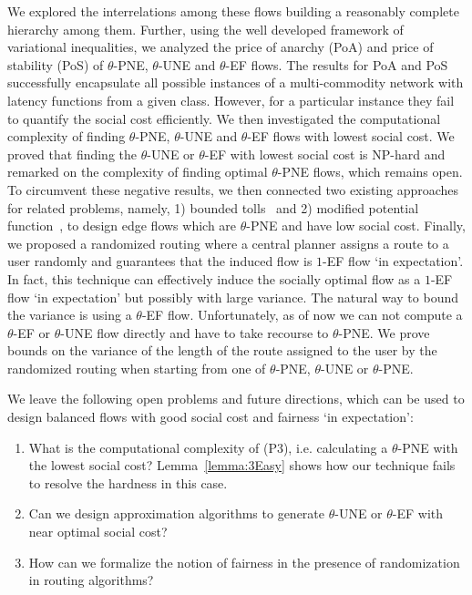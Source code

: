 We explored the interrelations among these flows building a reasonably complete hierarchy among them. Further, using the well developed framework of variational inequalities, we analyzed the price of anarchy (PoA) and price of stability (PoS) of $\theta$-PNE, $\theta$-UNE and $\theta$-EF flows. The results for PoA and PoS successfully encapsulate all possible instances of a multi-commodity network with latency functions from a given class. However, for a particular instance they fail to quantify the social cost efficiently.  
We then investigated the computational complexity of
finding $\theta$-PNE, $\theta$-UNE and $\theta$-EF flows with lowest social cost.  We proved that finding the $\theta$-UNE or $\theta$-EF with lowest social cost is NP-hard and remarked on the complexity of finding optimal $\theta$-PNE flows, which remains open.  
To circumvent these negative results, we then connected two existing approaches for related problems, namely, 1) bounded tolls~\cite{bonifaci2011efficiency} and  2) modified potential function~\cite{christodoulou2011performance}, to design edge flows which are $\theta$-PNE and have low social cost. Finally, we proposed a randomized routing where a central planner assigns a route to a user randomly and guarantees that the induced flow is $1$-EF flow `in expectation'. In fact, this technique can effectively induce the socially optimal flow as a $1$-EF flow `in expectation' but  possibly with large variance. The natural way to bound the variance is using a $\theta$-EF flow. Unfortunately, as of now we can not compute a $\theta$-EF or $\theta$-UNE flow directly and have to take recourse to $\theta$-PNE. We prove bounds on the variance of the length of the route assigned to the user by the randomized routing when starting from one of $\theta$-PNE, $\theta$-UNE or $\theta$-PNE.
         
We leave the following open problems and future directions, which can be used to design balanced flows with good social cost and fairness `in expectation': 
\begin{enumerate}
\item What is the computational complexity of (P3), i.e. calculating a $\theta$-PNE with the lowest social cost? Lemma~\ref{lemma:3Easy} shows how our technique fails to resolve the hardness in this case.
\item Can we design approximation algorithms to generate $\theta$-UNE or $\theta$-EF with near optimal social cost?
\item How can we formalize the notion of fairness in the presence of randomization in routing algorithms? 
\end{enumerate}   


